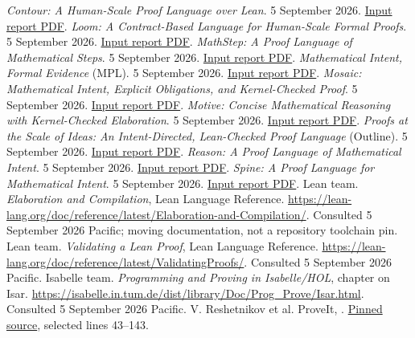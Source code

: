 \documentclass[11pt,letterpaper]{article}
\newcommand{\source}[2]{\href{#1}{#2}}
\begin{document}
\clearpage
\begin{thebibliography}{99}
\raggedright
{}
 \emph{Contour: A Human-Scale Proof Language over Lean}.
5 September 2026. \source{../ideas/contour-proof-language/contour.pdf}{Input report PDF}.
 \emph{Loom: A Contract-Based Language for Human-Scale Formal Proofs}.
5 September 2026. \source{../ideas/loom_proof_language/loom.pdf}{Input report PDF}.
 \emph{MathStep: A Proof Language of Mathematical Steps}.
5 September 2026. \source{../ideas/MathStep/MathStep.pdf}{Input report PDF}.
 \emph{Mathematical Intent, Formal Evidence} (MPL).
5 September 2026. \source{../ideas/mathematical_proof_language/article.pdf}{Input report PDF}.
 \emph{Mosaic: Mathematical Intent, Explicit Obligations, and
Kernel-Checked Proof}. 5 September 2026.
\source{../ideas/mosaic_proof_language/mosaic.pdf}{Input report PDF}.
 \emph{Motive: Concise Mathematical Reasoning with Kernel-Checked
Elaboration}. 5 September 2026.
\source{../ideas/motive_proof_language_article/motive.pdf}{Input report PDF}.
 \emph{Proofs at the Scale of Ideas: An Intent-Directed,
Lean-Checked Proof Language} (Outline). 5 September 2026.
\source{../ideas/outline_proof_language/outline_proof_language.pdf}{Input report PDF}.
 \emph{Reason: A Proof Language of Mathematical Intent}.
5 September 2026. \source{../ideas/reason_proof_language/reason.pdf}{Input report PDF}.
 \emph{Spine: A Proof Language for Mathematical Intent}.
5 September 2026.
\source{../ideas/Spine_Proof_Language/Spine_Proof_Language.pdf}{Input report PDF}.
 Lean team. \emph{Elaboration and Compilation}, Lean Language
Reference. \url{https://lean-lang.org/doc/reference/latest/Elaboration-and-Compilation/}.
Consulted 5 September 2026 Pacific; moving documentation, not a repository toolchain pin.
 Lean team. \emph{Validating a Lean Proof}, Lean Language
Reference. \url{https://lean-lang.org/doc/reference/latest/ValidatingProofs/}.
Consulted 5 September 2026 Pacific.
 Isabelle team. \emph{Programming and Proving in Isabelle/HOL},
chapter on Isar. \url{https://isabelle.in.tum.de/dist/library/Doc/Prog_Prove/Isar.html}.
Consulted 5 September 2026 Pacific.
 V. Reshetnikov et al. ProveIt,
.
\source{https://github.com/VladimirReshetnikov/ProveIt/blob/7c4e3f109405b9805b35d27ae96bf09c7ee5f3d5/Analysis/FabiusFunction/Lean/FabiusFunction/BinomialInversion.lean}{Pinned source}, selected lines 43--143.

\end{thebibliography}
\end{document}
